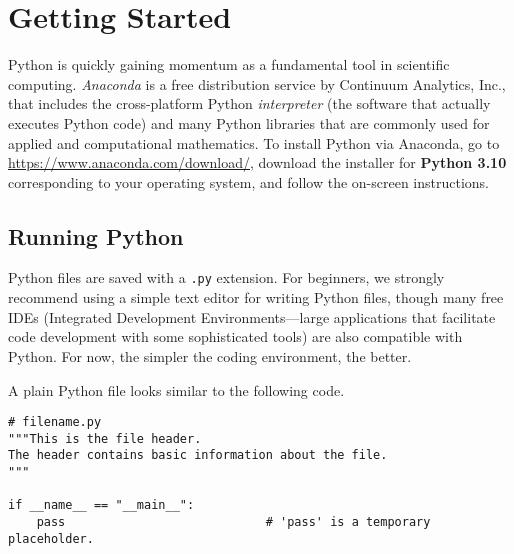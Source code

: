\label{lab:Python_Intro}

\section*{Getting Started} %

Python is quickly gaining momentum as a fundamental tool in scientific computing.
\emph{Anaconda} is a free distribution service by Continuum Analytics, Inc., that includes the cross-platform Python \emph{interpreter} (the software that actually executes Python code) and many Python libraries that are commonly used for applied and computational mathematics.
To install Python via Anaconda, go to \url{https://www.anaconda.com/download/}, download the installer for \textbf{Python 3.10} corresponding to your operating system, and follow the on-screen instructions.

\subsection*{Running Python} %

Python files are saved with a \texttt{.py} extension.
For beginners, we strongly recommend using a simple text editor for writing Python files, though many free IDEs (Integrated Development Environments---large applications that facilitate code development with some sophisticated tools) are also compatible with Python.
For now, the simpler the coding environment, the better.

A plain Python file looks similar to the following code.

\begin{lstlisting}
# filename.py
"""This is the file header.
The header contains basic information about the file.
"""

if __name__ == "__main__":
    pass                            # 'pass' is a temporary placeholder.
\end{lstlisting}

